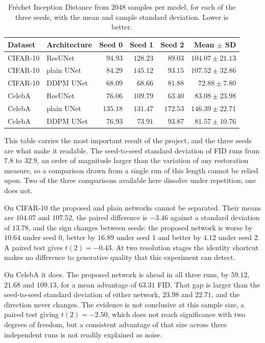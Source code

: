 \begin{table}[htbp]
    \centering
    \caption{Fr\'echet Inception Distance from 2048 samples per model, for each of the three
    seeds, with the mean and sample standard deviation. Lower is better.}
    \label{tab:fid}
    \begin{tabular}{llrrrr}
        \toprule
        Dataset & Architecture & Seed 0 & Seed 1 & Seed 2 & Mean $\pm$ SD \\
        \midrule
        CIFAR-10 & ResUNet    & $94.93$ & $128.23$ & $89.03$ & $104.07 \pm 21.13$ \\
        CIFAR-10 & plain UNet & $84.29$ & $145.12$ & $93.15$ & $107.52 \pm 32.86$ \\
        CIFAR-10 & DDPM UNet  & $68.09$ & $68.66$ & $81.88$ & $\mathbf{72.88 \pm 7.80}$ \\
        \midrule
        CelebA   & ResUNet    & $76.06$ & $109.79$ & $63.40$ & $83.08 \pm 23.98$ \\
        CelebA   & plain UNet & $135.18$ & $131.47$ & $172.53$ & $146.39 \pm 22.71$ \\
        CelebA   & DDPM UNet  & $76.93$ & $73.91$ & $93.87$ & $\mathbf{81.57 \pm 10.76}$ \\
        \bottomrule
    \end{tabular}
\end{table}

This table carries the most important result of the project, and the three seeds are what make it
readable. The seed-to-seed standard deviation of FID runs from $7.8$ to $32.9$, an order of
magnitude larger than the variation of any restoration measure, so a comparison drawn from a single
run of this length cannot be relied upon. Two of the three comparisons available here dissolve under
repetition; one does not.

On CIFAR-10 the proposed and plain networks cannot be separated. Their means are $104.07$ and
$107.52$, the paired difference is $-3.46$ against a standard deviation of $13.78$, and the sign
changes between seeds: the proposed network is worse by $10.64$ under seed 0, better by $16.89$
under seed 1 and better by $4.12$ under seed 2. A paired test gives $t(2) = -0.43$. At two
resolution stages the identity shortcut makes no difference to generative quality that this
experiment can detect.

On CelebA it does. The proposed network is ahead in all three runs, by $59.12$, $21.68$ and
$109.13$, for a mean advantage of $63.31$ FID. That gap is larger than the seed-to-seed standard
deviation of either network, $23.98$ and $22.71$, and the direction never changes. The evidence is
not conclusive at this sample size, a paired test giving $t(2) = -2.50$, which does not reach
significance with two degrees of freedom, but a consistent advantage of that size across three
independent runs is not readily explained as noise.

